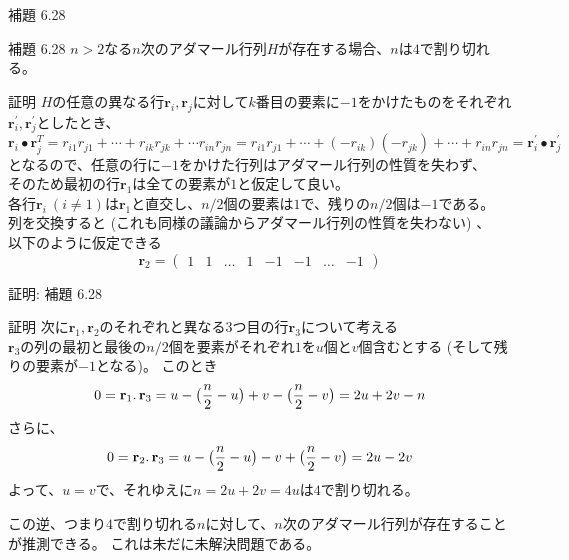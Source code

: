 \documentclass[dvipdfmx,10pt,jsarticle]{beamer}
\begin{document}
  \begin{frame}{補題 6.28}
    \begin{block}{補題 6.28}
      $n > 2$なる$n$次のアダマール行列$H$が存在する場合、$n$は$4$で割り切れる。
    \end{block}

      \begin{block}{証明}
        $H$の任意の異なる行$\mathbf{r}_i, \mathbf{r}_j$に対して$k$番目の要素に$-1$をかけたものをそれぞれ$\mathbf{r}_i^\prime, \mathbf{r}_j^\prime$としたとき、
        \[ \mathbf{r}_i \bullet \mathbf{r}_j^T = r_{i1}r_{j1} + \cdots + r_{ik}r_{jk} + \cdots r_{in}r_{jn}
        = r_{i1}r_{j1} + \cdots + (-r_{ik})(-r_{jk}) + \cdots + r_{in}r_{jn} = \mathbf{r}_i^\prime \bullet \mathbf{r}_j^\prime \]
        となるので、任意の行に$-1$をかけた行列はアダマール行列の性質を失わず、 \\そのため最初の行$\mathbf{r}_1$は全ての要素が$1$と仮定して良い。\\
        各行$\mathbf{r}_i \ (i \neq 1)$は$\mathbf{r}_1$と直交し、$n/2$個の要素は$1$で、残りの$n/2$個は$-1$である。 \\
        列を交換すると (これも同様の議論からアダマール行列の性質を失わない) 、 \\ 以下のように仮定できる
        \[ \mathbf{r}_2 = \begin{pmatrix} 1 & 1 & \ldots & 1 & -1 & -1 & \ldots & -1 \end{pmatrix} \]
      \end{block}
  \end{frame}
  \begin{frame}{証明: 補題 6.28}
      \begin{block}{証明}
        次に$\mathbf{r}_1, \mathbf{r}_2$のそれぞれと異なる$3$つ目の行$\mathbf{r}_3$について考える \\
        $\mathbf{r}_3$の列の最初と最後の$n/2$個を要素がそれぞれ$1$を$u$個と$v$個含むとする (そして残りの要素が$-1$となる)。 このとき
        \[0 = \mathbf{r}_1 \ldotp \mathbf{r}_3 = u - \big( \frac n2 - u \big) + v - \big( \frac n2 - v \big) = 2u + 2v - n\]
        さらに、
        \[ 0 = \mathbf{r}_2 \ldotp \mathbf{r}_3 = u - \big( \frac n2 - u \big) - v + \big( \frac n2 - v \big) = 2u - 2v \]
        よって、$u = v$で、それゆえに$n = 2u + 2v = 4u$は$4$で割り切れる。
      \end{block}
      この逆、つまり$4$で割り切れる$n$に対して、$n$次のアダマール行列が存在することが推測できる。
      これは未だに未解決問題である。
  \end{frame}
\end{document}
